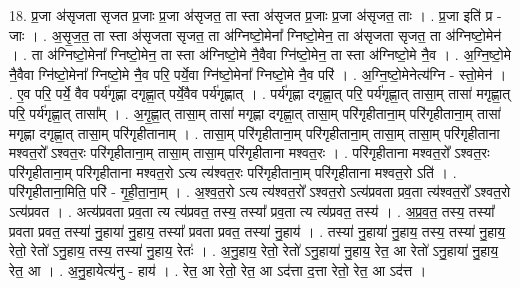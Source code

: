 \documentclass[17pt]{extarticle}
\begin{document}
18. प्र॒जा अ॑सृजता सृजत प्र॒जाः प्र॒जा अ॑सृजत॒ ता स्ता अ॑सृजत प्र॒जाः प्र॒जा अ॑सृजत॒ ताः । . प्र॒जा इति॑ प्र - जाः । . अ॒सृ॒ज॒त॒ ता स्ता अ॑सृजता सृजत॒ ता अ॑ग्निष्टो॒मेना᳚ ग्निष्टो॒मेन॒ ता अ॑सृजता सृजत॒ ता अ॑ग्निष्टो॒मेन॑ । . ता अ॑ग्निष्टो॒मेना᳚ ग्निष्टो॒मेन॒ ता स्ता अ॑ग्निष्टो॒मे नै॒वैवा ग्नि॑ष्टो॒मेन॒ ता स्ता अ॑ग्निष्टो॒मे नै॒व । . अ॒ग्नि॒ष्टो॒मे नै॒वैवा ग्नि॑ष्टो॒मेना᳚ ग्निष्टो॒मे नै॒व परि॒ पर्ये॒वा ग्नि॑ष्टो॒मेना᳚ ग्निष्टो॒मे नै॒व परि॑ । . अ॒ग्नि॒ष्टो॒मेनेत्य॑ग्नि - स्तो॒मेन॑ । . ए॒व परि॒ पर्ये॒ वैव पर्य॑गृह्णा दगृह्णा॒त् पर्ये॒वैव पर्य॑गृह्णात् । . पर्य॑गृह्णा दगृह्णा॒त् परि॒ पर्य॑गृह्णा॒त् तासा॒म् तासा॑ मगृह्णा॒त् परि॒ पर्य॑गृह्णा॒त् तासा᳚म् । . अ॒गृ॒ह्णा॒त् तासा॒म् तासा॑ मगृह्णा दगृह्णा॒त् तासा॒म् परि॑गृहीताना॒म् परि॑गृहीताना॒म् तासा॑ मगृह्णा दगृह्णा॒त् तासा॒म् परि॑गृहीतानाम् । . तासा॒म् परि॑गृहीताना॒म् परि॑गृहीताना॒म् तासा॒म् तासा॒म् परि॑गृहीताना मश्वत॒रो᳚ ऽश्वत॒रः परि॑गृहीताना॒म् तासा॒म् तासा॒म् परि॑गृहीताना मश्वत॒रः । . परि॑गृहीताना मश्वत॒रो᳚ ऽश्वत॒रः परि॑गृहीताना॒म् परि॑गृहीताना मश्वत॒रो ऽत्य त्य॑श्वत॒रः परि॑गृहीताना॒म् परि॑गृहीताना मश्वत॒रो ऽति॑ । . परि॑गृहीताना॒मिति॒ परि॑ - गृ॒ही॒ता॒ना॒म् । . अ॒श्व॒त॒रो ऽत्य त्य॑श्वत॒रो᳚ ऽश्वत॒रो ऽत्य॑प्रवता प्रव॒ता त्य॑श्वत॒रो᳚ ऽश्वत॒रो ऽत्य॑प्रवत । . अत्य॑प्रवता प्रव॒ता त्य त्य॑प्रवत॒ तस्य॒ तस्या᳚ प्रव॒ता त्य त्य॑प्रवत॒ तस्य॑ । . अ॒प्र॒व॒त॒ तस्य॒ तस्या᳚ प्रवता प्रवत॒ तस्या॑ नु॒हाया॑ नु॒हाय॒ तस्या᳚ प्रवता प्रवत॒ तस्या॑ नु॒हाय॑ । . तस्या॑ नु॒हाया॑ नु॒हाय॒ तस्य॒ तस्या॑ नु॒हाय॒ रेतो॒ रेतो॑ ऽनु॒हाय॒ तस्य॒ तस्या॑ नु॒हाय॒ रेतः॑ । . अ॒नु॒हाय॒ रेतो॒ रेतो॑ ऽनु॒हाया॑ नु॒हाय॒ रेत॒ आ रेतो॑ ऽनु॒हाया॑ नु॒हाय॒ रेत॒ आ । . अ॒नु॒हायेत्य॑नु - हाय॑ । . रेत॒ आ रेतो॒ रेत॒ आ ऽद॑त्ता द॒त्ता रेतो॒ रेत॒ आ ऽद॑त्त । \newline
\end{document}
